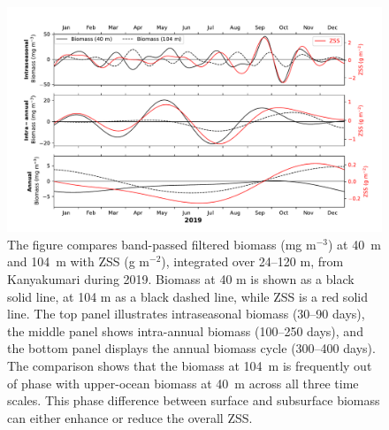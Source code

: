 \documentclass[12pt,a4paper]{article}
\begin{document}
\begin{figure}[htbp]
	\centering
	\includegraphics[width=\textwidth]{./fig_s03_ss_biomass_comparison_intraseasonal_band.pdf} 
	\caption{The figure compares band-passed filtered biomass (mg m$^{-3}$) at 40~m  and 104~m with ZSS (g m$^{-2}$), integrated over 24--120 m, from Kanyakumari during 2019. Biomass at 40 m is shown as a black solid line, at 104 m as a black dashed line, while ZSS is a red solid line. The top panel illustrates intraseasonal biomass (30–90 days), the middle panel shows intra-annual biomass (100–250 days), and the bottom panel displays the annual biomass cycle (300–400 days).  The comparison shows that the biomass at 104~m is frequently out of phase with upper-ocean biomass at 40~m across all three time scales. This phase difference between surface and subsurface biomass can either enhance or reduce the overall ZSS.}
	\label{fig:40_104_biomass_zss}
\end{figure}
\end{document}
